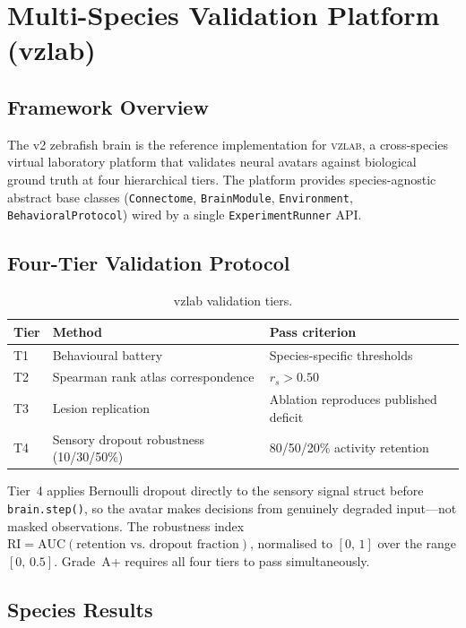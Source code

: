 \documentclass[11pt,a4paper]{article}
\begin{document}
\section{Multi-Species Validation Platform (vzlab)}\label{sec:vzlab}

\subsection{Framework Overview}

The v2 zebrafish brain is the reference implementation for
\textsc{vzlab}, a cross-species virtual laboratory platform that
validates neural avatars against biological ground truth at four
hierarchical tiers.
The platform provides species-agnostic abstract base classes
(\texttt{Connectome}, \texttt{BrainModule}, \texttt{Environment},
\texttt{BehavioralProtocol}) wired by a single
\texttt{ExperimentRunner} API.

\subsection{Four-Tier Validation Protocol}

\begin{table}[h]
\centering
\caption{vzlab validation tiers.}
\begin{tabular}{lll}
\toprule
Tier & Method & Pass criterion \\
\midrule
T1 & Behavioural battery & Species-specific thresholds \\
T2 & Spearman rank atlas correspondence & $r_s > 0.50$ \\
T3 & Lesion replication & Ablation reproduces published deficit \\
T4 & Sensory dropout robustness (10/30/50\%) & 80/50/20\% activity retention \\
\bottomrule
\end{tabular}
\end{table}

\noindent Tier~4 applies Bernoulli dropout directly to the sensory
signal struct before \texttt{brain.step()}, so the avatar makes
decisions from genuinely degraded input---not masked observations.
The robustness index $\text{RI} = \text{AUC}(\text{retention vs.\ dropout fraction})$,
normalised to $[0,\,1]$ over the range $[0,\,0.5]$.
Grade~A+ requires all four tiers to pass simultaneously.

\subsection{Species Results}
\end{document}
